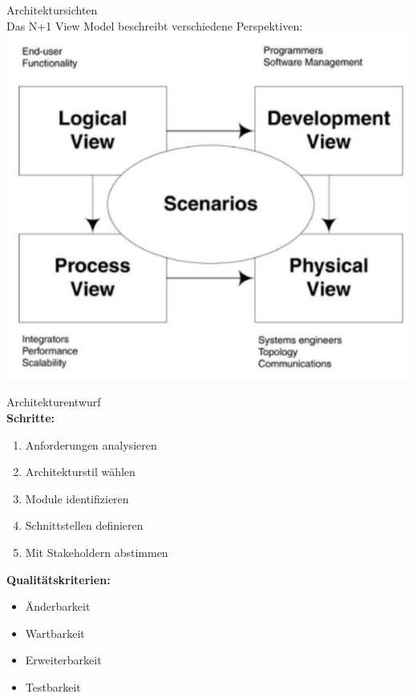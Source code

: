 \begin{concept}{Architektursichten}\\
Das N+1 View Model beschreibt verschiedene Perspektiven:\\
\includegraphics[width=0.9\linewidth]{images/2024_12_29_0d1d7b5551ea1b4b41bdg-09}
\end{concept}

\begin{KR}{Architekturentwurf}\\
\textbf{Schritte:}
\begin{enumerate}
    \item Anforderungen analysieren
    \item Architekturstil wählen
    \item Module identifizieren
    \item Schnittstellen definieren
    \item Mit Stakeholdern abstimmen
\end{enumerate}

\textbf{Qualitätskriterien:}
\begin{itemize}
    \item Änderbarkeit
    \item Wartbarkeit
    \item Erweiterbarkeit
    \item Testbarkeit
\end{itemize}
\end{KR}

